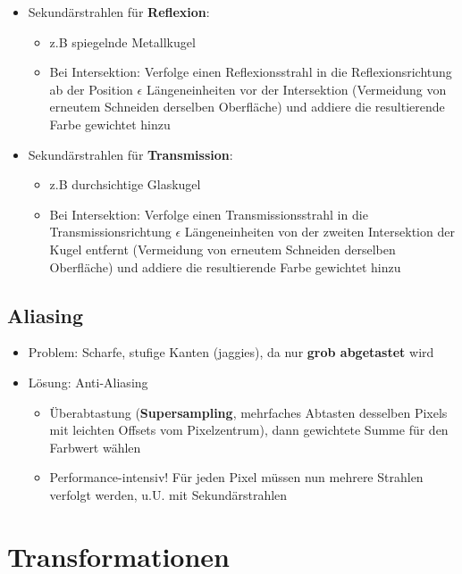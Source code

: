 \documentclass[10pt,a4paper]{article}
\begin{document}
	\begin{itemize}
		\item Sekundärstrahlen für \textbf{Reflexion}:
			\begin{itemize}
				\item z.B spiegelnde Metallkugel
				\item Bei Intersektion: Verfolge einen Reflexionsstrahl in die Reflexionsrichtung ab der Position $\epsilon$ Längeneinheiten vor der Intersektion (Vermeidung von erneutem Schneiden derselben Oberfläche) und addiere die resultierende Farbe gewichtet hinzu
			\end{itemize}
		\item Sekundärstrahlen für \textbf{Transmission}:
			\begin{itemize}
				\item z.B durchsichtige Glaskugel
				\item Bei Intersektion: Verfolge einen Transmissionsstrahl in die Transmissionsrichtung $\epsilon$ Längeneinheiten von der zweiten Intersektion der Kugel entfernt (Vermeidung von erneutem Schneiden derselben Oberfläche) und addiere die resultierende Farbe gewichtet hinzu
			\end{itemize}
	\end{itemize}

	\subsection{Aliasing}
	\label{rt:sub:aliasing}
	
	\begin{itemize}
		\item Problem: Scharfe, stufige Kanten (\glqq jaggies\grqq), da nur \textbf{grob abgetastet} wird
		\item Lösung: Anti-Aliasing
		\begin{itemize}
			\item Überabtastung (\textbf{Supersampling}, mehrfaches Abtasten desselben Pixels mit leichten Offsets vom Pixelzentrum), dann gewichtete Summe für den Farbwert wählen
			\item Performance-intensiv! Für jeden Pixel müssen nun mehrere Strahlen verfolgt werden, u.U. mit Sekundärstrahlen
		\end{itemize}
	\end{itemize}

	\newpage
	\section{Transformationen}
	\label{tf:sec:transformationen}
	
\end{document}
